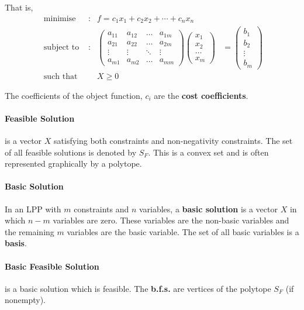 	That is,
\begin{align}
\text{ minimise } & : & f = c_1x_1 + c_2x_2 + \dotsb + c_nx_n & \\
\text{ subject to } & : & \begin{pmatrix} a_{11} & a_{12} & \dots & a_{1m} \\ a_{21} & a_{22} & \dots & a_{2m} \\ \vdots & \vdots & \ddots & \vdots \\ a_{m1} & a_{m2} & \dots & a_{mm} \end{pmatrix} \begin{pmatrix} x_1 \\ x_2 \\ \dots \\ x_m \end{pmatrix} & = \begin{pmatrix} b_1 \\ b_2 \\ \vdots \\ b_m \end{pmatrix} \\
\text{ such that } & & X \ge 0 &
\end{align}

	The coefficients of the object function, $c_i$ are the \textbf{cost coefficients}.

\paragraph{Feasible Solution} is a vector $X$ satisfying both constraints and non-negativity constraints. The set of all feasible solutions is denoted by $S_F$. This is a convex set and is often represented graphically by a polytope.

\paragraph{Basic Solution} In an LPP with $m$ constraints and $n$ variables, a \textbf{basic solution} is a vector $X$ in which $n-m$ variables are zero. These variables are the non-basic variables and the remaining $m$ variables are the basic variable. The set of all basic variables is a \textbf{basis}.

\paragraph{Basic Feasible Solution} is a basic solution which is feasible. The \textbf{b.f.s.} are vertices of the polytope $S_F$ (if nonempty).

